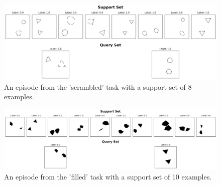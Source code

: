 \documentclass[10pt,letterpaper]{article}
\begin{document}
\begin{figure}[H]
    \centering
    \includegraphics[width=0.9\columnwidth]{figures/scrambled_support8_ep0_boxed.png}
    \caption{An episode from the 'scrambled' task with a support set of 8 examples.}
    \label{fig:scrambled_episode}
\end{figure}

\begin{figure}[H]
    \centering
    \includegraphics[width=0.9\columnwidth]{figures/filled_support10_ep0_boxed.png}
    \caption{An episode from the 'filled' task with a support set of 10 examples.}
    \label{fig:filled_episode}
\end{figure}
\end{document}
